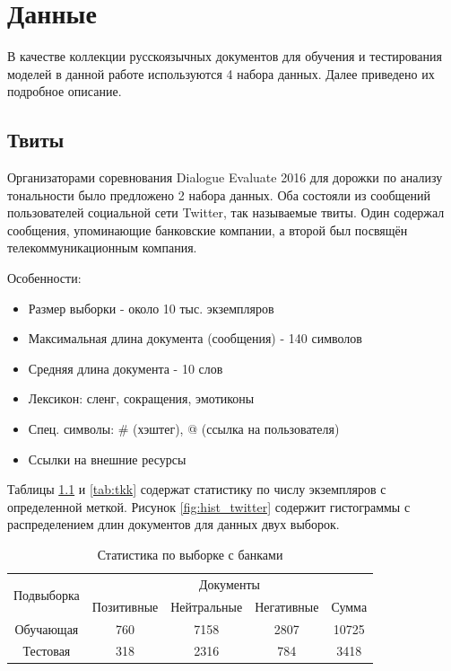 \chapter{Данные}
В качестве коллекции русскоязычных документов для обучения и тестирования моделей в данной работе используются 4 набора данных. Далее приведено их подробное описание.

\section{Твиты}
Организаторами соревнования Dialogue Evaluate 2016 для дорожки по анализу тональности было предложено 2 набора данных. Оба состояли из сообщений пользователей социальной сети Twitter, так называемые твиты.
Один содержал сообщения, упоминающие банковские компании, а второй был посвящён телекоммуникационным компания.

Особенности:
\begin{itemize}
	\item Размер выборки - около 10 тыс. экземпляров
	\item Максимальная длина документа (сообщения) - 140 символов
	\item Средняя длина документа - 10 слов
	\item Лексикон: сленг, сокращения, эмотиконы
	\item Спец. символы: \# (хэштег), @ (ссылка на пользователя)
	\item Ссылки на внешние ресурсы
\end{itemize}

Таблицы \ref{tab:bank} и \ref{tab:tkk} содержат статистику по числу экземпляров с определенной меткой. Рисунок \ref{fig:hist_twitter} содержит гистограммы с распределением длин документов для данных двух выборок.

\begin{table}[H]
\centering
\caption{Статистика по выборке с банками}
\label{tab:bank}
\begin{tabular}{|c|c|c|c|c|}
\hline
\multirow{2}{*}{Подвыборка} & \multicolumn{4}{c|}{Документы}                \\ \cline{2-5} 
                            & Позитивные & Нейтральные & Негативные & Сумма \\ \hline
Обучающая                   & 760        & 7158        & 2807       & 10725 \\ \hline
Тестовая                    & 318        & 2316        & 784        & 3418  \\ \hline
\end{tabular}
\end{table}

